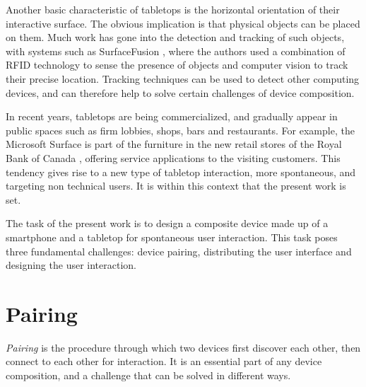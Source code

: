 Another basic characteristic of tabletops is the horizontal orientation of their interactive surface.
The obvious implication is that physical objects can be placed on them.
Much work has gone into the detection and tracking of such objects, with systems such as SurfaceFusion \citep{Olwal:2008:surfacefusion}, where the authors used a combination of RFID technology to sense the presence of objects and computer vision to track their precise location.
Tracking techniques can be used to detect other computing devices, and can therefore help to solve certain challenges of device composition.

%

In recent years, tabletops are being commercialized, and gradually appear in public spaces such as firm lobbies, shops, bars and restaurants.
For example, the Microsoft Surface is part of the furniture in the new retail stores of the Royal Bank of Canada \citep{mscase}, offering service applications to the visiting customers.
This tendency gives rise to a new type of tabletop interaction, more spontaneous, and targeting non technical users.
It is within this context that the present work is set.

The task of the present work is to design a composite device made up of a smartphone and a tabletop for spontaneous user interaction.
This task poses three fundamental challenges: device pairing, distributing the user interface and designing the user interaction.

\section{Pairing}

\emph{Pairing} is the procedure through which two devices first discover each other, then connect to each other for interaction.
It is an essential part of any device composition, and a challenge that can be solved in different ways.

